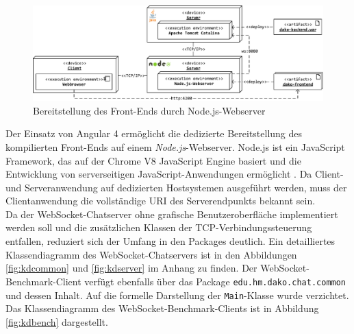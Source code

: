 \documentclass[11pt,a4paper,titlepage]{scrartcl}
\numberwithin{equation}{section}
\begin{document}
\medskip
\begin{figure}[ht] 
	\begin{center}
		\includegraphics[scale=0.8]{img/vtfohneb.pdf}
		\caption{Bereitstellung des Front-Ends durch Node.js-Webserver}
		\label{fig:Verteilung2}
	\end{center}
\end{figure}

\noindent Der Einsatz von Angular 4 ermöglicht die dedizierte Bereitstellung des kompilierten Front-Ends auf einem \textit{Node.js}-Webserver. Node.js ist ein JavaScript Framework, das auf der Chrome V8 JavaScript Engine basiert und die Entwicklung von serverseitigen JavaScript-Anwendungen ermöglicht \autocite{node_js_foundation_node.js_2018}. Da Client- und Serveranwendung auf dedizierten Hostsystemen ausgeführt werden, muss der Clientanwendung die vollständige URI des Serverendpunkts bekannt sein.\\

\noindent Da der WebSocket-Chatserver ohne grafische Benutzeroberfläche implementiert werden soll und die zusätzlichen Klassen der TCP-Verbindungssteuerung entfallen, reduziert sich der Umfang in den Packages deutlich. Ein detailliertes Klassendiagramm des WebSocket-Chatservers ist in den Abbildungen \ref{fig:kdcommon} und \ref{fig:kdserver} im Anhang zu finden. Der WebSocket-Benchmark-Client verfügt ebenfalls über das Package \texttt{edu.hm.dako.chat.common} und dessen Inhalt. Auf die formelle Darstellung der \texttt{Main}-Klasse wurde verzichtet. Das Klassendiagramm des WebSocket-Benchmark-Clients ist in Abbildung \ref{fig:kdbench} dargestellt. \\
\end{document}
